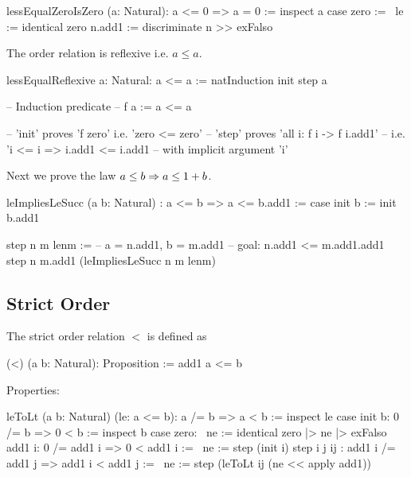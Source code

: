 \begin{alba}
    lessEqualZeroIsZero (a: Natural): a <= 0 => a = 0 :=
        inspect a case
            zero :=
                \ le := identical zero
            n.add1 :=
                discriminate {n} >> exFalso
\end{alba}





\noindent The order relation is reflexive i.e. $a \le a$.

\begin{alba}
    lessEqualReflexive {a: Natural}: a <= a :=
        natInduction init step a

    -- Induction predicate
    -- f a := a <= a

    -- 'init' proves 'f zero' i.e. 'zero <= zero'
    -- 'step' proves 'all i: f i -> f i.add1'
    --     i.e. 'i <= i => i.add1 <= i.add1
    --     with implicit argument 'i'
\end{alba}



\noindent Next we prove the law $a \le b \Rightarrow a \le 1 + b$.

\begin{alba}
    leImpliesLeSucc
        (a b: Natural)
        :  a <= b  =>  a <= b.add1
    :=
        case
            init b :=
                init b.add1

            step n m lenm :=
                -- a = n.add1, b = m.add1
                -- goal: n.add1 <= m.add1.add1
                step
                    n
                    m.add1
                    (leImpliesLeSucc n m lenm)
\end{alba}











\subsection{Strict Order}

\noindent The strict order relation $<$ is defined as

\begin{alba}
  (<) (a b: Natural): Proposition :=
    add1 a <= b
\end{alba}

Properties:

\begin{alba}
    leToLt (a b: Natural) (le: a <= b): a /= b => a < b :=
        inspect le case
            init b: 0 /= b => 0 < b :=
                inspect b case
                    zero: \ ne := identical zero |> ne |> exFalso
                    add1 i: 0 /= add1 i => 0 < add1 i :=
                        \ ne := step (init i)
            step i j ij
            : add1 i /= add1 j => add1 i < add1 j :=
                \ ne :=
                    step (leToLt ij (ne << apply add1))
\end{alba}



